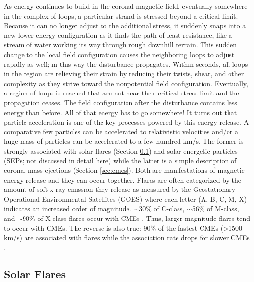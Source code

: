 As energy continues to build in the coronal magnetic field, eventually somewhere in the complex of loops, a particular strand is stressed beyond a critical limit. Because it can no longer adjust to the additional stress, it suddenly snaps into a new lower-energy configuration as it finds the path of least resistance, like a stream of water working its way through rough downhill terrain. This sudden change to the local field configuration causes the neighboring loops to adjust rapidly as well; in this way the disturbance propagates. Within seconds, all loops in the region are relieving their strain by reducing their twists, shear, and other complexity as they strive toward the nonpotential field configuration. Eventually, a region of loops is reached that are not near their critical stress limit and the propagation ceases. The field configuration after the disturbance contains less energy than before. All of that energy has to go somewhere! It turns out that particle acceleration is one of the key processes powered by this energy release. A comparative few particles can be accelerated to relativistic velocities and/or a huge mass of particles can be accelerated to a few hundred km/s. The former is strongly associated with solar flares (Section \ref{sec:solarflares}) and solar energetic particles (SEPs; not discussed in detail here) while the latter is a simple description of coronal mass ejections (Section \ref{sec:cmes}). Both are manifestations of magnetic energy release and they can occur together. Flares are often categorized by the amount of soft x-ray emission they release as measured by the Geostationary Operational Environmental Satellites (GOES) where each letter (A, B, C, M, X) indicates an increased order of magnitude. $\sim$30\% of C-class, $\sim$56\% of M-class, and $\sim$90\% of X-class flares occur with CMEs \citep{Yashiro2005, Wang2007}. Thus, larger magnitude flares tend to occur with CMEs. The reverse is also true: 90\% of the fastest CMEs (\textgreater 1500 km/s) are associated with flares while the association rate drops for slower CMEs \citep{Wang2008}. 

\subsection{Solar Flares}
\label{sec:solarflares}

